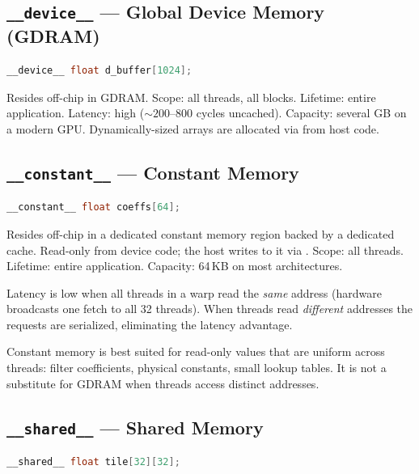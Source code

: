 \subsection{\texttt{\_\_device\_\_} --- Global Device Memory (GDRAM)}
\label{ssec:var-device}

\begin{lstlisting}[language=C++]
__device__ float d_buffer[1024];
\end{lstlisting}

Resides off-chip in GDRAM. Scope: all threads, all blocks. Lifetime: entire
application. Latency: high (${\sim}200$--$800$ cycles uncached). Capacity:
several GB on a modern GPU. Dynamically-sized arrays are allocated via
 from host code.

\subsection{\texttt{\_\_constant\_\_} --- Constant Memory}
\label{ssec:var-constant}

\begin{lstlisting}[language=C++]
__constant__ float coeffs[64];
\end{lstlisting}

Resides off-chip in a dedicated constant memory region backed by a dedicated
cache. Read-only from device code; the host writes to it via
. Scope: all threads. Lifetime: entire
application. Capacity: 64\,KB on most architectures.

Latency is low when all threads in a warp read the \emph{same} address
(hardware broadcasts one fetch to all 32 threads). When threads read
\emph{different} addresses the requests are serialized, eliminating the
latency advantage.

\begin{ppnote}
Constant memory is best suited for read-only values that are uniform across
threads: filter coefficients, physical constants, small lookup tables. It is
not a substitute for GDRAM when threads access distinct addresses.
\end{ppnote}

\subsection{\texttt{\_\_shared\_\_} --- Shared Memory}
\label{ssec:var-shared}

\begin{lstlisting}[language=C++]
__shared__ float tile[32][32];
\end{lstlisting}

